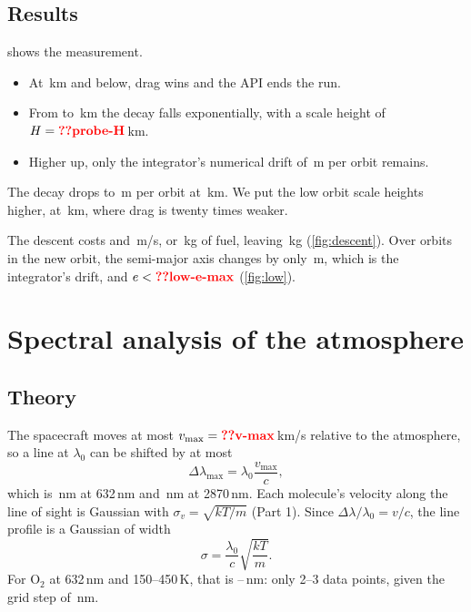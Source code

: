 \documentclass[aps,prd,twocolumn,nofootinbib,floatfix,superscriptaddress]{revtex4-2}
\begin{document}
\subsection{Results}
 shows the measurement.
\begin{itemize}
\item At \,km and below, drag wins and the API ends the run.
\item From  to \,km the decay falls exponentially, with a scale height of $H=\val{probe-H}$\,km.
\item Higher up, only the integrator's numerical drift of \,m per orbit remains.
\end{itemize}
The decay drops to \,m per orbit at \,km.
We put the low orbit  scale heights higher, at \,km, where drag is twenty times weaker.

The descent costs  and \,m/s, or \,kg of fuel, leaving \,kg (\cref{fig:descent}).
Over  orbits in the new orbit, the semi-major axis changes by only \,m, which is the integrator's drift, and $e<\val{low-e-max}$ (\cref{fig:low}).


\section{Spectral analysis of the atmosphere}\label{sec:spectrum}
\subsection{Theory}
The spacecraft moves at most $v_{\max}=\val{v-max}$\,km/s relative to the atmosphere, so a line at $\lambda_0$ can be shifted by at most
\begin{equation}
  \Delta\lambda_{\max}=\lambda_0\frac{v_{\max}}{c},
\end{equation}
which is \,nm at 632\,nm and \,nm at 2870\,nm.
Each molecule's velocity along the line of sight is Gaussian with $\sigma_v=\sqrt{kT/m}$ (Part 1).
Since $\Delta\lambda/\lambda_0=v/c$, the line profile is a Gaussian of width
\begin{equation}
  \sigma=\frac{\lambda_0}{c}\sqrt{\frac{kT}{m}}. \label{eq:width}
\end{equation}
For O$_2$ at 632\,nm and 150--450\,K, that is --\,nm: only 2--3 data points, given the grid step of \,nm.
\end{document}
